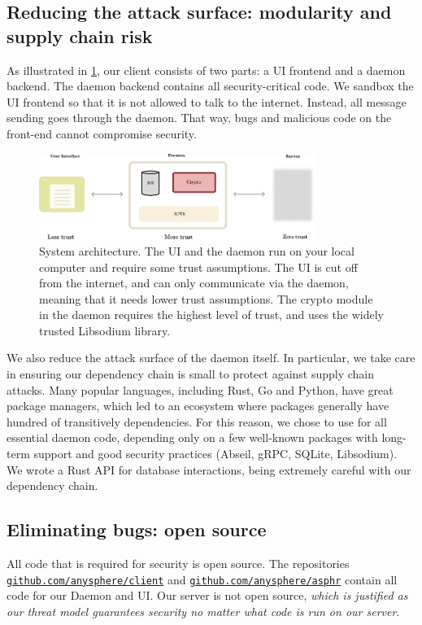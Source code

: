 \subsection{Reducing the attack surface: modularity and supply chain risk}

As illustrated in \cref{fig:systemdiagram}, our client consists of two parts: a UI frontend and a daemon backend. The daemon backend contains all security-critical code. We sandbox the UI frontend so that it is not allowed to talk to the internet. Instead, all message sending goes through the daemon. That way, bugs and malicious code on the front-end cannot compromise security.
\begin{figure}
    \centering
    \includegraphics[width=0.8\textwidth]{systemdiagram.pdf}
\caption{System architecture. The UI and the daemon run on your local computer and require some trust assumptions. The UI is cut off from the internet, and can only communicate via the daemon, meaning that it needs lower trust assumptions. The crypto module in the daemon requires the highest level of trust, and uses the widely trusted Libsodium library.}
\label{fig:systemdiagram}
\end{figure}
We also reduce the attack surface of the daemon itself. In particular, we take care in ensuring our dependency chain is small to protect against supply chain attacks. Many popular languages, including Rust, Go and Python, have great package managers, which led to an ecosystem where packages generally have hundred of transitively dependencies. For this reason, we chose to use \Cpp for all essential daemon code, depending only on a few well-known packages with long-term support and good security practices (Abseil, gRPC, SQLite, Libsodium). We wrote a Rust API for database interactions, being extremely careful with our dependency chain. 

\subsection{Eliminating bugs: open source}

All code that is required for security is open source. The repositories \\ {\tt \href{https://github.com/anysphere/client}{github.com/anysphere/client}} and  {\tt \href{https://github.com/anysphere/asphr}{github.com/anysphere/asphr}} contain all code for our Daemon and UI. Our server is not open source, \textit{which is justified as our threat model guarantees security no matter what code is run on our server}. 

